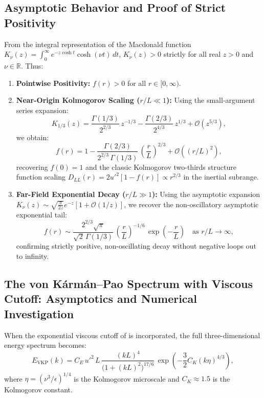 \documentclass[lineno]{jfm}
\begin{document}
\subsection{Asymptotic Behavior and Proof of Strict Positivity}
From the integral representation of the Macdonald function $K_\nu(z) = \int_0^\infty e^{-z\cosh t}\cosh(\nu t)\,dt$, $K_\nu(z) > 0$ strictly for all real $z > 0$ and $\nu \in \mathbb{R}$. Thus:
\begin{enumerate}
\item \textbf{Pointwise Positivity:} $f(r) > 0$ for all $r \in [0, \infty)$.
\item \textbf{Near-Origin Kolmogorov Scaling ($r/L \ll 1$):} Using the small-argument series expansion:
\begin{equation}
K_{1/3}(z) = \frac{\Gamma(1/3)}{2^{2/3}}\,z^{-1/3} - \frac{\Gamma(2/3)}{2^{4/3}}\,z^{1/3} + \mathcal{O}(z^{5/3}),
\end{equation}
we obtain:
\begin{equation}
f(r) = 1 - \frac{\Gamma(2/3)}{2^{2/3}\,\Gamma(1/3)}\,\left(\frac{r}{L}\right)^{2/3} + \mathcal{O}\left((r/L)^2\right),
\end{equation}
recovering $f(0) = 1$ and the classic Kolmogorov two-thirds structure function scaling $D_{LL}(r) = 2 u'^2 [1 - f(r)] \propto r^{2/3}$ in the inertial subrange.
\item \textbf{Far-Field Exponential Decay ($r/L \gg 1$):} Using the asymptotic expansion $K_\nu(z) \sim \sqrt{\frac{\pi}{2z}} e^{-z} [1 + \mathcal{O}(1/z)]$, we recover the non-oscillatory asymptotic exponential tail:
\begin{equation}
f(r) \sim \frac{2^{2/3}\sqrt{\pi}}{\sqrt{2}\,\Gamma(1/3)}\,\left(\frac{r}{L}\right)^{-1/6}\,\exp\left(-\frac{r}{L}\right) \quad \text{as } r/L \to \infty,
\end{equation}
confirming strictly positive, non-oscillating decay without negative loops out to infinity.
\end{enumerate}

\subsection{The von K\'arm\'an--Pao Spectrum with Viscous Cutoff: Asymptotics and Numerical Investigation}

When the exponential viscous cutoff of \citet{Pao1965} is incorporated, the full three-dimensional energy spectrum becomes:
\begin{equation}
E_{\text{VKP}}(k) = C_E\,u'^2\,L\,\frac{(kL)^4}{\big(1 + (kL)^2\big)^{17/6}}\,\exp\left(-\frac{3}{2} C_K (k\eta)^{4/3}\right),
\label{eq:app_vkp_3d}
\end{equation}
where $\eta = (\nu^3/\epsilon)^{1/4}$ is the Kolmogorov microscale and $C_K \approx 1.5$ is the Kolmogorov constant.
\end{document}
